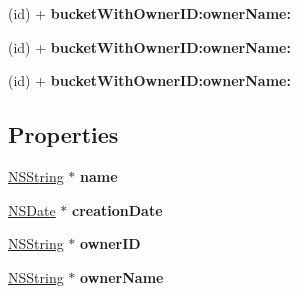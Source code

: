 \begin{DoxyCompactItemize}
\item 
\hypertarget{interface_a_s_i_s3_bucket_a8290afccd00ee3a62be379100f363ef9}{
(id) + {\bfseries bucket\-With\-Owner\-I\-D\-:owner\-Name\-:}}
\label{interface_a_s_i_s3_bucket_a8290afccd00ee3a62be379100f363ef9}

\item 
\hypertarget{interface_a_s_i_s3_bucket_a8290afccd00ee3a62be379100f363ef9}{
(id) + {\bfseries bucket\-With\-Owner\-I\-D\-:owner\-Name\-:}}
\label{interface_a_s_i_s3_bucket_a8290afccd00ee3a62be379100f363ef9}

\item 
\hypertarget{interface_a_s_i_s3_bucket_a8290afccd00ee3a62be379100f363ef9}{
(id) + {\bfseries bucket\-With\-Owner\-I\-D\-:owner\-Name\-:}}
\label{interface_a_s_i_s3_bucket_a8290afccd00ee3a62be379100f363ef9}

\end{DoxyCompactItemize}
\subsection*{\-Properties}
\begin{DoxyCompactItemize}
\item 
\hypertarget{interface_a_s_i_s3_bucket_a3958d867ec32dc397e21d3c7b2155fec}{
\hyperlink{class_n_s_string}{\-N\-S\-String} $\ast$ {\bfseries name}}
\label{interface_a_s_i_s3_bucket_a3958d867ec32dc397e21d3c7b2155fec}

\item 
\hypertarget{interface_a_s_i_s3_bucket_acb6979cbfb0d82321ce2fbd99f952533}{
\hyperlink{class_n_s_date}{\-N\-S\-Date} $\ast$ {\bfseries creation\-Date}}
\label{interface_a_s_i_s3_bucket_acb6979cbfb0d82321ce2fbd99f952533}

\item 
\hypertarget{interface_a_s_i_s3_bucket_afd35c3483b939dfe28eac9b9a15b6fdc}{
\hyperlink{class_n_s_string}{\-N\-S\-String} $\ast$ {\bfseries owner\-I\-D}}
\label{interface_a_s_i_s3_bucket_afd35c3483b939dfe28eac9b9a15b6fdc}

\item 
\hypertarget{interface_a_s_i_s3_bucket_aba8942f62c48ab9239bf91046d602684}{
\hyperlink{class_n_s_string}{\-N\-S\-String} $\ast$ {\bfseries owner\-Name}}
\label{interface_a_s_i_s3_bucket_aba8942f62c48ab9239bf91046d602684}

\end{DoxyCompactItemize}


